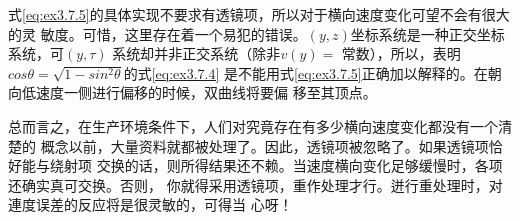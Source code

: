 式\ref{eq:ex3.7.5}的具体实现不要求有透镜项，所以对于横向速度变化可望不会有很大的灵
敏度。可惜，这里存在着一个易犯的错误。$(y,z)$坐标系统是一种正交坐标系统，可$(y,\tau)$
系统却并非正交系统（除非$v(y)=$
常数），所以，表明$cos\theta=\sqrt{1-sin^2\theta}$的式\ref{eq:ex3.7.4}
是不能用式\ref{eq:ex3.7.5}正确加以解释的。在朝向低速度一侧进行偏移的时候，双曲线将要偏
移至其顶点。

总而言之，在生产环境条件下，人们对究竟存在有多少横向速度变化都没有一个清楚的
概念以前，大量资料就都被处理了。因此，透镜项被忽略了。如果透镜项恰好能与绕射项
交换的话，则所得结果还不赖。当速度横向变化足够缓慢时，各项还确实真可交换。否则，
你就得采用透镜项，重作处理才行。迸行重处理时，对連度误差的反应将是很灵敏的，可得当
心呀！

